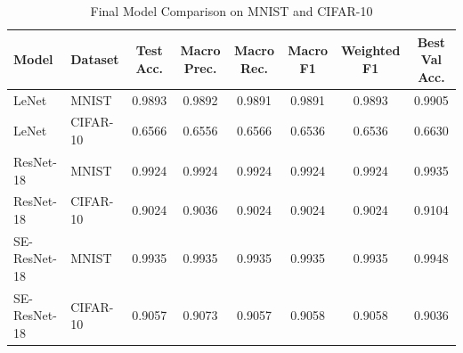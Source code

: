 \begin{table}[t]
\centering
\caption{Final Model Comparison on MNIST and CIFAR-10}
\label{tab:final_model_comparison}
\begin{tabular}{llcccccc}
\hline
Model & Dataset & Test Acc. & Macro Prec. & Macro Rec. & Macro F1 & Weighted F1 & Best Val Acc. \\
\hline
LeNet & MNIST & 0.9893 & 0.9892 & 0.9891 & 0.9891 & 0.9893 & 0.9905 \\
LeNet & CIFAR-10 & 0.6566 & 0.6556 & 0.6566 & 0.6536 & 0.6536 & 0.6630 \\
ResNet-18 & MNIST & 0.9924 & 0.9924 & 0.9924 & 0.9924 & 0.9924 & 0.9935 \\
ResNet-18 & CIFAR-10 & 0.9024 & 0.9036 & 0.9024 & 0.9024 & 0.9024 & 0.9104 \\
SE-ResNet-18 & MNIST & 0.9935 & 0.9935 & 0.9935 & 0.9935 & 0.9935 & 0.9948 \\
SE-ResNet-18 & CIFAR-10 & 0.9057 & 0.9073 & 0.9057 & 0.9058 & 0.9058 & 0.9036 \\
\hline
\end{tabular}
\end{table}